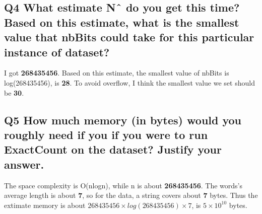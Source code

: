 \documentclass[11pt]{article} %
\begin{document}
\subsection{Q4 What estimate Nˆ do you get this time? Based on this estimate, what is the smallest value that nbBits could take for this particular instance of dataset?}

I got \textbf{268435456}. Based on this estimate, the smallest value of nbBits is {log(268435456)}, is \textbf{28}. To avoid overflow, I think the smallest value we set should be \textbf{30}.

\subsection{Q5 How much memory (in bytes) would you roughly need if you if you were to run ExactCount on the dataset? Justify your answer.}
The space complexity is O(nlogn), while n is about \textbf{268435456}. The words's average length is about \textbf{7}, so for the data, a string covers about \textbf{7} bytes. Thus the extimate memory is about $268435456\times log(268435456)\times7$, is \textbf{$5\times10^{10}$} bytes.
\end{document}
